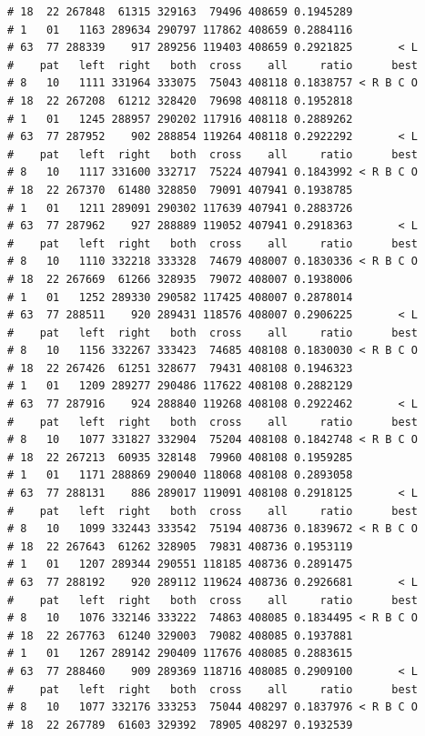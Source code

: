 \documentclass{article}\usepackage[]{graphicx}\usepackage[]{color}
\makeatletter
\newenvironment{kframe}{%
 \def\at@end@of@kframe{}%
 \ifinner\ifhmode%
  \def\at@end@of@kframe{\end{minipage}}%
  \begin{minipage}{\columnwidth}%
 \fi\fi%
 \def\FrameCommand##1{\hskip\@totalleftmargin \hskip-\fboxsep
 \colorbox{shadecolor}{##1}\hskip-\fboxsep
     \hskip-\linewidth \hskip-\@totalleftmargin \hskip\columnwidth}%
 \MakeFramed {\advance\hsize-\width
   \@totalleftmargin\z@ \linewidth\hsize
   \@setminipage}}%
 {\par\unskip\endMakeFramed%
 \at@end@of@kframe}
\newenvironment{knitrout}{}{} %
\makeatother
\begin{document}
\begin{knitrout}
\begin{kframe}
\begin{verbatim}
# 18  22 267848  61315 329163  79496 408659 0.1945289          
# 1   01   1163 289634 290797 117862 408659 0.2884116          
# 63  77 288339    917 289256 119403 408659 0.2921825       < L
#    pat   left  right   both  cross    all     ratio      best
# 8   10   1111 331964 333075  75043 408118 0.1838757 < R B C O
# 18  22 267208  61212 328420  79698 408118 0.1952818          
# 1   01   1245 288957 290202 117916 408118 0.2889262          
# 63  77 287952    902 288854 119264 408118 0.2922292       < L
#    pat   left  right   both  cross    all     ratio      best
# 8   10   1117 331600 332717  75224 407941 0.1843992 < R B C O
# 18  22 267370  61480 328850  79091 407941 0.1938785          
# 1   01   1211 289091 290302 117639 407941 0.2883726          
# 63  77 287962    927 288889 119052 407941 0.2918363       < L
#    pat   left  right   both  cross    all     ratio      best
# 8   10   1110 332218 333328  74679 408007 0.1830336 < R B C O
# 18  22 267669  61266 328935  79072 408007 0.1938006          
# 1   01   1252 289330 290582 117425 408007 0.2878014          
# 63  77 288511    920 289431 118576 408007 0.2906225       < L
#    pat   left  right   both  cross    all     ratio      best
# 8   10   1156 332267 333423  74685 408108 0.1830030 < R B C O
# 18  22 267426  61251 328677  79431 408108 0.1946323          
# 1   01   1209 289277 290486 117622 408108 0.2882129          
# 63  77 287916    924 288840 119268 408108 0.2922462       < L
#    pat   left  right   both  cross    all     ratio      best
# 8   10   1077 331827 332904  75204 408108 0.1842748 < R B C O
# 18  22 267213  60935 328148  79960 408108 0.1959285          
# 1   01   1171 288869 290040 118068 408108 0.2893058          
# 63  77 288131    886 289017 119091 408108 0.2918125       < L
#    pat   left  right   both  cross    all     ratio      best
# 8   10   1099 332443 333542  75194 408736 0.1839672 < R B C O
# 18  22 267643  61262 328905  79831 408736 0.1953119          
# 1   01   1207 289344 290551 118185 408736 0.2891475          
# 63  77 288192    920 289112 119624 408736 0.2926681       < L
#    pat   left  right   both  cross    all     ratio      best
# 8   10   1076 332146 333222  74863 408085 0.1834495 < R B C O
# 18  22 267763  61240 329003  79082 408085 0.1937881          
# 1   01   1267 289142 290409 117676 408085 0.2883615          
# 63  77 288460    909 289369 118716 408085 0.2909100       < L
#    pat   left  right   both  cross    all     ratio      best
# 8   10   1077 332176 333253  75044 408297 0.1837976 < R B C O
# 18  22 267789  61603 329392  78905 408297 0.1932539          

\end{verbatim}
\end{kframe}
\end{knitrout}
\end{document}
